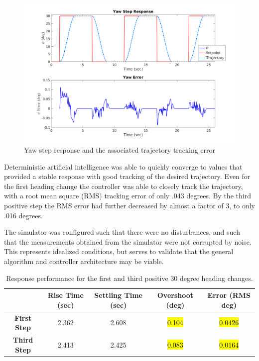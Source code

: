 \documentclass[applsci,article,submit,pdftex,moreauthors]{Definitions/mdpi}
\begin{document}
\begin{paracol}{2}
\begin{figure}[h]
\centering
\includegraphics[width=15cm,inner]{dai_step.png}
\caption{Yaw step response and the associated trajectory tracking error \label{fig:dai_step}}
\end{figure}

Deterministic artificial intelligence was able to quickly converge to values that provided a stable response with good tracking of the desired trajectory. Even for the first heading change the controller was able to closely track the trajectory, with a root mean square (RMS) tracking error of only .043 degrees. By the third positive step the RMS error had further decreased by almost a factor of 3, to only .016 degrees.

The simulator was configured such that there were no disturbances, and such that the measurements obtained from the simulator were not corrupted by noise. This represents idealized conditions, but serves to validate that the general algorithm and controller architecture may be viable.

\begin{table}[ht]
  \begin{center}
    \begin{tabular}{|c|c|c|c|c| } 
      \hline
      & Rise Time (sec) & Settling Time (sec) & Overshoot (deg)  & Error (RMS deg) \\
      \hline
      \textbf{First Step} & 2.362 & 2.608 & \hl{0.104} & \hl{0.0426} \\
      \hline
      \textbf{Third Step} & 2.413 & 2.425 & \hl{0.083} & \hl{0.0164} \\
      \hline  
    \end{tabular}
  \end{center}
  \caption{\label{tab:results}Response performance for the first and third positive 30 degree heading changes.}
\end{table}


\end{paracol}
\end{document}

